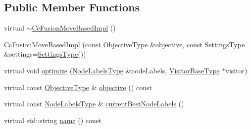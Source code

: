 \subsection*{Public Member Functions}
\begin{DoxyCompactItemize}
\item 
virtual \hyperlink{classnifty_1_1graph_1_1opt_1_1common_1_1detail__cc__fusion_1_1CcFusionMoveBasedImpl_a017995a1591959b12b4bb4a8cbf57557}{$\sim$\+Cc\+Fusion\+Move\+Based\+Impl} ()
\item 
\hyperlink{classnifty_1_1graph_1_1opt_1_1common_1_1detail__cc__fusion_1_1CcFusionMoveBasedImpl_a30678d68bd90de395d875e500a075df7}{Cc\+Fusion\+Move\+Based\+Impl} (const \hyperlink{classnifty_1_1graph_1_1opt_1_1common_1_1detail__cc__fusion_1_1CcFusionMoveBasedImpl_aa9866b5feaad59ab66248cbefc28e6c0}{Objective\+Type} \&\hyperlink{classnifty_1_1graph_1_1opt_1_1common_1_1detail__cc__fusion_1_1CcFusionMoveBasedImpl_af9355be55bd8497b059a2e5b1842a20b}{objective}, const \hyperlink{structnifty_1_1graph_1_1opt_1_1common_1_1detail__cc__fusion_1_1CcFusionMoveBasedImpl_1_1SettingsType}{Settings\+Type} \&settings=\hyperlink{structnifty_1_1graph_1_1opt_1_1common_1_1detail__cc__fusion_1_1CcFusionMoveBasedImpl_1_1SettingsType}{Settings\+Type}())
\item 
virtual void \hyperlink{classnifty_1_1graph_1_1opt_1_1common_1_1detail__cc__fusion_1_1CcFusionMoveBasedImpl_a7e5468a6297e5a7a3e859181a9897da5}{optimize} (\hyperlink{classnifty_1_1graph_1_1opt_1_1common_1_1detail__cc__fusion_1_1CcFusionMoveBasedImpl_a4bcaf3e64809f68b1713161641e66c64}{Node\+Labels\+Type} \&node\+Labels, \hyperlink{classnifty_1_1graph_1_1opt_1_1common_1_1detail__cc__fusion_1_1CcFusionMoveBasedImpl_a0a1c77f29d556ed955a81473884e0d82}{Visitor\+Base\+Type} $\ast$visitor)
\item 
virtual const \hyperlink{classnifty_1_1graph_1_1opt_1_1common_1_1detail__cc__fusion_1_1CcFusionMoveBasedImpl_aa9866b5feaad59ab66248cbefc28e6c0}{Objective\+Type} \& \hyperlink{classnifty_1_1graph_1_1opt_1_1common_1_1detail__cc__fusion_1_1CcFusionMoveBasedImpl_af9355be55bd8497b059a2e5b1842a20b}{objective} () const
\item 
virtual const \hyperlink{classnifty_1_1graph_1_1opt_1_1common_1_1detail__cc__fusion_1_1CcFusionMoveBasedImpl_a4bcaf3e64809f68b1713161641e66c64}{Node\+Labels\+Type} \& \hyperlink{classnifty_1_1graph_1_1opt_1_1common_1_1detail__cc__fusion_1_1CcFusionMoveBasedImpl_a5a9998c1989b7fce1069b9dcbe843af8}{current\+Best\+Node\+Labels} ()
\item 
virtual std\+::string \hyperlink{classnifty_1_1graph_1_1opt_1_1common_1_1detail__cc__fusion_1_1CcFusionMoveBasedImpl_a9459a4f6ad993df8433782ce671801e0}{name} () const
\end{DoxyCompactItemize}


